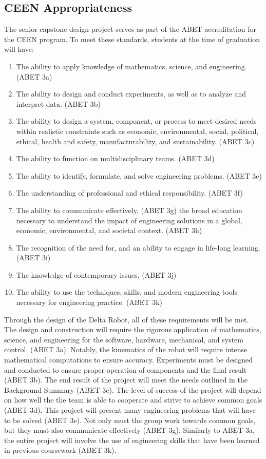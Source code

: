 \documentclass[11pt]{report}
\begin{document}
\newpage
\subsection{CEEN Appropriateness}
\par The senior capstone design project serves as part of the ABET accreditation for the CEEN program. To meet these standards, students at the time of graduation will have:
\begin{enumerate} \parskip2pt
	\item The ability to apply knowledge of mathematics, science, and engineering. (ABET 3a)
	\item The ability to design and conduct experiments, as well as to analyze and interpret data. (ABET 3b)
	\item The ability to design a system, component, or process to meet desired needs within realistic constraints such as economic, environmental, social, political, ethical, health and safety, manufacturability, and sustainability. (ABET 3c)
	\item The ability to function on multidisciplinary teams. (ABET 3d)
	\item The ability to identify, formulate, and solve engineering problems. (ABET 3e)
	\item The understanding of professional and ethical responsibility. (ABET 3f)
	\item The ability to communicate effectively. (ABET 3g)
the broad education necessary to understand the impact of engineering solutions in a global, economic, environmental, and societal context. (ABET 3h)
	\item The recognition of the need for, and an ability to engage in life-long learning. (ABET 3i)
	\item The knowledge of contemporary issues. (ABET 3j)
	\item The ability to use the techniques, skills, and modern engineering tools necessary for engineering practice. (ABET 3k)
\end{enumerate}

\par Through the design of the Delta Robot, all of these requirements will be met. The design and construction will require the rigorous application of mathematics, science, and engineering for the software, hardware, mechanical, and system control. (ABET 3a). Notably, the kinematics of the robot will require intense mathematical computations to ensure accuracy. Experiments must be designed and conducted to ensure proper operation of components and the final result (ABET 3b). The end result of the project will meet the needs outlined in the Background Summary (ABET 3c). The level of success of the project will depend on how well the the team is able to cooperate and strive to achieve common goals (ABET 3d). This project will present many engineering problems that will have to be solved (ABET 3e). Not only must the group work towards common goals, but they must also communicate effectively (ABET 3g). Similarly to ABET 3a, the entire project will involve the use of engineering skills that have been learned in previous coursework (ABET 3k).
\end{document}

